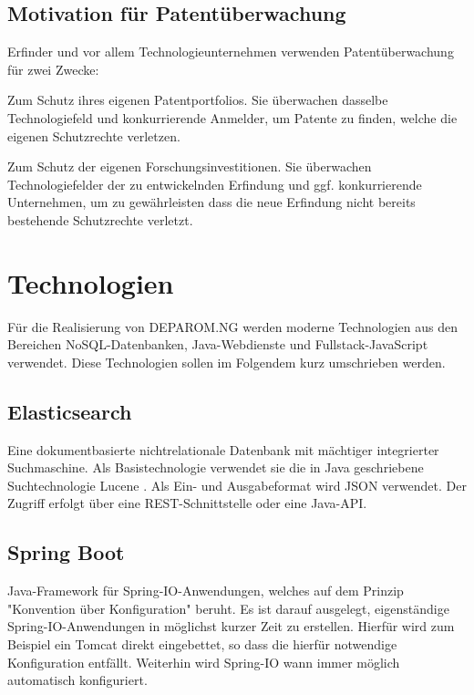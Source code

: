 \subsection{Motivation für Patentüberwachung}
\label{ch:fachlichesUmfeld:PatentspezifischeBegriffe:Motivation}

Erfinder und vor allem Technologieunternehmen verwenden Patentüberwachung für
zwei Zwecke:

Zum Schutz ihres eigenen Patentportfolios. Sie überwachen dasselbe
Technologiefeld und konkurrierende Anmelder, um Patente zu finden, welche die
eigenen Schutzrechte verletzen.

Zum Schutz der eigenen Forschungsinvestitionen. Sie überwachen Technologiefelder
der  zu entwickelnden Erfindung und ggf. konkurrierende Unternehmen, um zu
gewährleisten dass die neue Erfindung nicht bereits bestehende Schutzrechte
verletzt.

\section{Technologien}
\label{ch:fachlichesUmfeld:Technologien}

Für die Realisierung von DEPAROM.NG werden moderne Technologien aus den Bereichen
NoSQL-Datenbanken, Java-Webdienste und Fullstack-JavaScript verwendet. Diese
Technologien sollen im Folgendem kurz umschrieben werden.

\subsection{Elasticsearch}
\label{ch:fachlichesUmfeld:Technologien:Elastichsearch}

Eine dokumentbasierte nichtrelationale Datenbank mit mächtiger integrierter
Suchmaschine. Als Basistechnologie verwendet sie die in Java geschriebene
Suchtechnologie Lucene \cite{lucene}. Als Ein- und Ausgabeformat wird JSON
verwendet. Der Zugriff erfolgt über eine REST-Schnittstelle oder eine Java-API.

\subsection{Spring Boot}
\label{ch:fachlichesUmfeld:Technologien:SpringBoot}

Java-Framework für Spring-IO-Anwendungen, welches auf dem Prinzip "Konvention
über Konfiguration" beruht. Es ist darauf ausgelegt, eigenständige
Spring-IO-Anwendungen in möglichst kurzer Zeit zu erstellen. Hierfür wird zum
Beispiel ein Tomcat direkt eingebettet, so dass die  hierfür notwendige
Konfiguration entfällt. Weiterhin wird Spring-IO wann immer möglich automatisch
konfiguriert.

